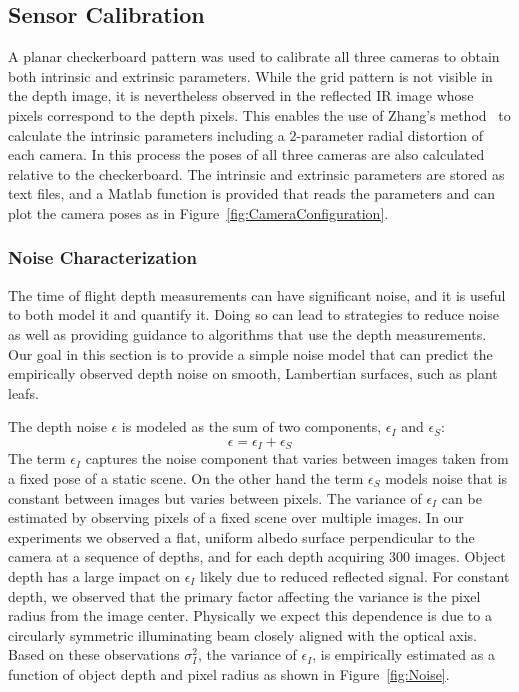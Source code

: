 

\subsection{Sensor Calibration}

A planar checkerboard pattern was used to calibrate all three cameras to obtain both intrinsic and extrinsic parameters.  While the grid pattern is not visible in the depth image, it is nevertheless observed in the reflected IR image whose pixels correspond to the depth pixels.  This enables the use of Zhang's method~\cite{Zhang2000} to calculate the intrinsic parameters including a $2$-parameter radial distortion of each camera.  In this process the poses of all three cameras are also calculated relative to the checkerboard.  The intrinsic and extrinsic parameters are stored as text files, and a Matlab function is provided that reads the parameters and can plot the camera poses as in Figure~\ref{fig:CameraConfiguration}.


\subsubsection{Noise Characterization}
\label{sec:bias}

The time of flight depth measurements can have significant noise, and it is useful to both model it and quantify it.  Doing so can lead to strategies to reduce noise as well as providing guidance to algorithms that use the depth measurements.  Our goal in this section is to provide a simple noise model that can predict the empirically observed depth noise on smooth, Lambertian surfaces, such as plant leafs.

The depth noise $\epsilon$ is modeled as the sum of two components, $\epsilon_I$ and $\epsilon_S$:
\begin{equation}
	\epsilon = \epsilon_I + \epsilon_S\label{eq:epsilon}
\end{equation}
The term $\epsilon_I$ captures the noise component that varies between images taken from a fixed pose of a static scene. On the other hand the term $\epsilon_S$ models noise that is constant between images but varies between pixels. The variance of $\epsilon_I$ can be estimated by observing pixels of a fixed scene over multiple images.  In our experiments we observed a flat, uniform albedo surface perpendicular to the camera at a sequence of depths, and for each depth acquiring 300 images.  Object depth has a large impact on $\epsilon_I$ likely due to reduced reflected signal.  For constant depth, we observed that the primary factor affecting the variance is the pixel radius from the image center.  Physically we expect this dependence is due to a circularly symmetric illuminating beam closely aligned with the optical axis.  Based on these observations $\sigma_I^2$, the variance of $\epsilon_I$, is empirically estimated as a function of object depth and pixel radius as shown in Figure~\ref{fig:Noise}.

